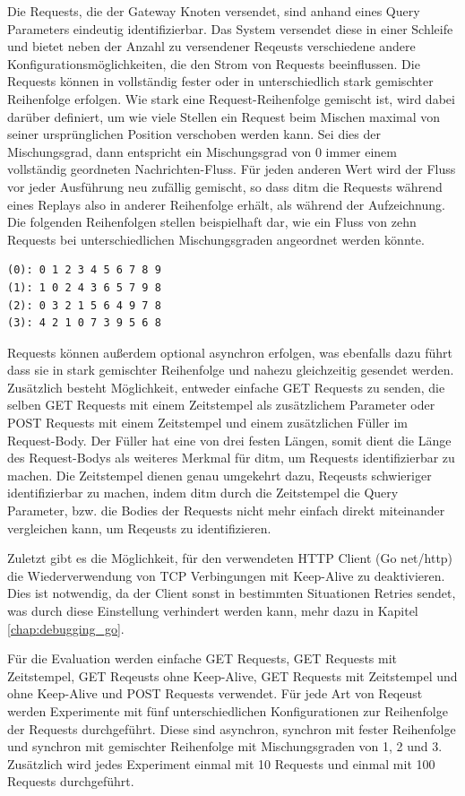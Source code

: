 \documentclass[12pt,a4paper]{report}
\begin{document}
Die Requests, die der Gateway Knoten versendet, sind anhand eines Query Parameters eindeutig identifizierbar. Das System versendet
diese in einer Schleife und bietet neben der Anzahl zu versendener Reqeusts verschiedene andere Konfigurationsmöglichkeiten, die
den Strom von Requests beeinflussen. Die Requests können in vollständig fester oder in unterschiedlich stark gemischter
Reihenfolge erfolgen. Wie stark eine Request-Reihenfolge gemischt ist, wird dabei darüber definiert, um wie viele Stellen ein
Request beim Mischen maximal von seiner ursprünglichen Position verschoben werden kann. Sei dies der Mischungsgrad, dann
entspricht ein Mischungsgrad von 0 immer einem vollständig geordneten Nachrichten-Fluss. Für jeden anderen Wert wird der Fluss vor
jeder Ausführung neu zufällig gemischt, so dass ditm die Requests während eines Replays also in anderer Reihenfolge erhält, als
während der Aufzeichnung. Die folgenden Reihenfolgen stellen beispielhaft dar, wie ein Fluss von zehn Requests bei
unterschiedlichen Mischungsgraden angeordnet werden könnte.
\begin{verbatim}
(0): 0 1 2 3 4 5 6 7 8 9
(1): 1 0 2 4 3 6 5 7 9 8
(2): 0 3 2 1 5 6 4 9 7 8
(3): 4 2 1 0 7 3 9 5 6 8
\end{verbatim}
Requests können außerdem optional asynchron erfolgen, was ebenfalls dazu führt dass sie in stark gemischter Reihenfolge und nahezu
gleichzeitig gesendet werden. Zusätzlich besteht Möglichkeit, entweder einfache GET Requests zu senden, die selben GET Requests
mit einem Zeitstempel als zusätzlichem Parameter oder POST Requests mit einem Zeitstempel und einem zusätzlichen Füller im
Request-Body. Der Füller hat eine von drei festen Längen, somit dient die Länge des Request-Bodys als weiteres Merkmal für ditm,
um Requests identifizierbar zu machen. Die Zeitstempel dienen genau umgekehrt dazu, Reqeusts schwieriger identifizierbar zu
machen, indem ditm durch die Zeitstempel die Query Parameter, bzw. die Bodies der Requests nicht mehr einfach direkt miteinander
vergleichen kann, um Reqeusts zu identifizieren.

Zuletzt gibt es die Möglichkeit, für den verwendeten HTTP Client (Go net/http) die Wiederverwendung von TCP Verbingungen mit Keep-Alive
zu deaktivieren. Dies ist notwendig, da der Client sonst in bestimmten Situationen Retries sendet, was durch diese Einstellung
verhindert werden kann, mehr dazu in Kapitel \ref{chap:debugging_go}.

Für die Evaluation werden einfache GET Requests, GET Requests mit Zeitstempel, GET Reqeusts ohne Keep-Alive, GET Requests mit
Zeitstempel und ohne Keep-Alive und POST Requests verwendet. Für jede Art von Reqeust werden Experimente mit fünf
unterschiedlichen Konfigurationen zur Reihenfolge der Requests durchgeführt. Diese sind asynchron, synchron mit fester Reihenfolge
und synchron mit gemischter Reihenfolge mit Mischungsgraden von 1, 2 und 3. Zusätzlich wird jedes Experiment einmal mit 10
Requests und einmal mit 100 Requests durchgeführt.
\end{document}
